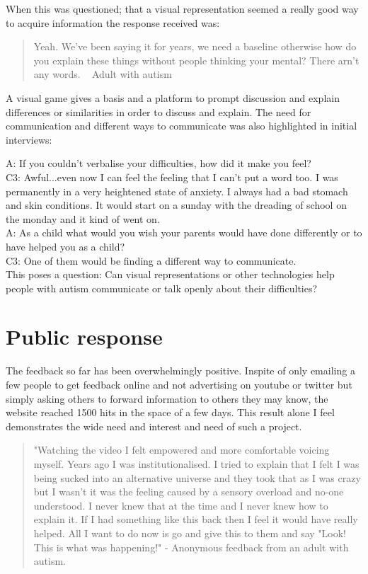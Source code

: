 \documentclass[11pt]{report}
\begin{document}
When this was questioned; that a visual representation seemed a really good way to acquire information the response received was:  

\begin{quote}
Yeah. We've been saying it for years, we need a baseline otherwise how do you explain these things without people thinking your mental? There arn't any words. ~ Adult with autism
\end{quote}

A visual game gives a basis and a platform to prompt discussion and explain differences or similarities in order to discuss and explain. The need for communication and different ways to communicate was also highlighted in initial interviews:

A: If you couldn’t verbalise your difficulties, how did it make you feel?\\
C3: Awful...even now I can feel the feeling that I can’t put a word too. I was permanently in a very heightened state of anxiety. I always had a bad stomach and skin conditions. It would start on a sunday with the dreading of school on the monday and it kind of went on. \\
A: As a child what would you wish your parents would have done differently or to have helped you as a child?\\
C3: One of them would be finding a different way to communicate.\\

This poses a question: Can visual representations or other technologies help people with autism communicate or talk openly about their difficulties? 

\section{Public response}
\label{sec:publicresponse}
The feedback so far has been overwhelmingly positive. Inspite of only emailing a few people to get feedback online and not advertising on youtube or twitter but simply asking others to forward information to others they may know, the website reached 1500 hits in the space of a few days. This result alone I feel demonstrates the wide need and interest and need of such a project. 

\begin{quote}
"Watching the video I felt empowered and more comfortable voicing myself. Years ago I was institutionalised. I tried to explain that I felt I was being sucked into an alternative universe and they took that as I was crazy but I wasn't it was the feeling caused by a sensory overload and no-one understood. I never knew that at the time and I never knew how to explain it. If I had something like this back then I feel it would have really helped. All I want to do now is go and give this to them and say "Look! This is what was happening!" - Anonymous feedback from an adult with autism.
\end{quote}
\end{document}
